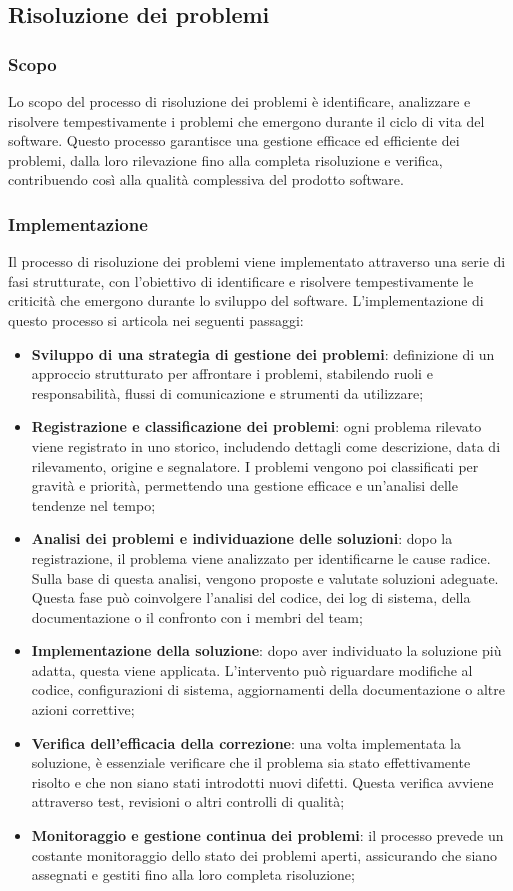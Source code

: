 \subsection{Risoluzione dei problemi}
\subsubsection{Scopo}
Lo scopo del processo di risoluzione dei problemi è identificare, analizzare e risolvere tempestivamente i problemi che emergono durante il ciclo di vita del software. Questo processo garantisce una gestione efficace ed efficiente dei problemi, dalla loro rilevazione fino alla completa risoluzione e verifica, contribuendo così alla qualità complessiva del prodotto software.

\subsubsection{Implementazione}
Il processo di risoluzione dei problemi viene implementato attraverso una serie di fasi strutturate, con l’obiettivo di identificare e risolvere tempestivamente le criticità che emergono durante lo sviluppo del software. L’implementazione di questo processo si articola nei seguenti passaggi:
\begin{itemize}
    \item \textbf{Sviluppo di una strategia di gestione dei problemi}: definizione di un approccio strutturato per affrontare i problemi, stabilendo ruoli e responsabilità, flussi di comunicazione e strumenti da utilizzare;
    \item \textbf{Registrazione e classificazione dei problemi}: ogni problema rilevato viene registrato in uno storico, includendo dettagli come descrizione, data di rilevamento, origine e segnalatore. I problemi vengono poi classificati per gravità e priorità, permettendo una gestione efficace e un'analisi delle tendenze nel tempo;
    \item \textbf{Analisi dei problemi e individuazione delle soluzioni}: dopo la registrazione, il problema viene analizzato per identificarne le cause radice. Sulla base di questa analisi, vengono proposte e valutate soluzioni adeguate. Questa fase può coinvolgere l'analisi del codice, dei log di sistema, della documentazione o il confronto con i membri del team;
    \item \textbf{Implementazione della soluzione}: dopo aver individuato la soluzione più adatta, questa viene applicata. L’intervento può riguardare modifiche al codice, configurazioni di sistema, aggiornamenti della documentazione o altre azioni correttive;
    \item \textbf{Verifica dell’efficacia della correzione}: una volta implementata la soluzione, è essenziale verificare che il problema sia stato effettivamente risolto e che non siano stati introdotti nuovi difetti. Questa verifica avviene attraverso test, revisioni o altri controlli di qualità;
    \item \textbf{Monitoraggio e gestione continua dei problemi}: il processo prevede un costante monitoraggio dello stato dei problemi aperti, assicurando che siano assegnati e gestiti fino alla loro completa risoluzione;
\end{itemize}

